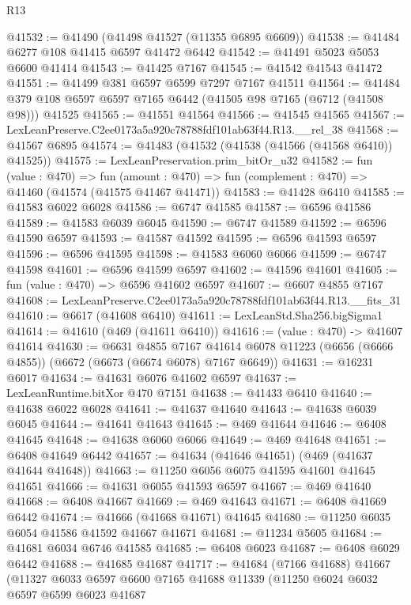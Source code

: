 \begin{lexlean}{R13}
\begin{coremodule}
@41532 := @41490 (@41498 @41527 (@11355 @6895 @6609))
@41538 := @41484 @6277 @108 @41415 @6597 @41472 @6442
@41542 := @41491 @5023 @5053 @6600 @41414
@41543 := @41425 @7167
@41545 := @41542 @41543 @41472
@41551 := @41499 @381 @6597 @6599 @7297 @7167 @41511
@41564 := @41484 @379 @108 @6597 @6597 @7165 @6442 (@41505 @98 @7165 (@6712 (@41508 @98))) @41525
@41565 := @41551 @41564
@41566 := @41545 @41565
@41567 := LexLeanPreserve.C2ee0173a5a920c78788fdf101ab63f44.R13.__rel_38
@41568 := @41567 @6895
@41574 := @41483 (@41532 (@41538 (@41566 (@41568 @6410)) @41525))
@41575 := LexLeanPreservation.prim_bitOr_u32
@41582 := fun (value : @470) =>
  fun (amount : @470) => fun (complement : @470) => @41460 (@41574 (@41575 @41467 @41471))
@41583 := @41428 @6410
@41585 := @41583 @6022 @6028
@41586 := @6747 @41585
@41587 := @6596 @41586
@41589 := @41583 @6039 @6045
@41590 := @6747 @41589
@41592 := @6596 @41590 @6597
@41593 := @41587 @41592
@41595 := @6596 @41593 @6597
@41596 := @6596 @41595
@41598 := @41583 @6060 @6066
@41599 := @6747 @41598
@41601 := @6596 @41599 @6597
@41602 := @41596 @41601
@41605 := fun (value : @470) => @6596 @41602 @6597
@41607 := @6607 @4855 @7167
@41608 := LexLeanPreserve.C2ee0173a5a920c78788fdf101ab63f44.R13.__fits_31
@41610 := @6617 (@41608 @6410)
@41611 := LexLeanStd.Sha256.bigSigma1
@41614 := @41610 (@469 (@41611 @6410))
@41616 := (value : @470) -> @41607 @41614
@41630 := @6631
    @4855
    @7167
    @41614
    @6078
    @11223
    (@6656 (@6666 @4855))
    (@6672 (@6673 (@6674 @6078) @7167 @6649))
@41631 := @16231 @6017
@41634 := @41631 @6076 @41602 @6597
@41637 := LexLeanRuntime.bitXor @470 @7151
@41638 := @41433 @6410
@41640 := @41638 @6022 @6028
@41641 := @41637 @41640
@41643 := @41638 @6039 @6045
@41644 := @41641 @41643
@41645 := @469 @41644
@41646 := @6408 @41645
@41648 := @41638 @6060 @6066
@41649 := @469 @41648
@41651 := @6408 @41649 @6442
@41657 := @41634 (@41646 @41651) (@469 (@41637 @41644 @41648))
@41663 := @11250 @6056 @6075 @41595 @41601 @41645 @41651
@41666 := @41631 @6055 @41593 @6597
@41667 := @469 @41640
@41668 := @6408 @41667
@41669 := @469 @41643
@41671 := @6408 @41669 @6442
@41674 := @41666 (@41668 @41671) @41645
@41680 := @11250 @6035 @6054 @41586 @41592 @41667 @41671
@41681 := @11234 @5605
@41684 := @41681 @6034 @6746 @41585
@41685 := @6408 @6023
@41687 := @6408 @6029 @6442
@41688 := @41685 @41687
@41717 := @41684
    (@7166 @41688)
    @41667
    (@11327
      @6033
      @6597
      @6600
      @7165
      @41688
      @11339
      (@11250
        @6024
        @6032
        @6597
        @6599
        @6023
        @41687

\end{coremodule}
\end{lexlean}
